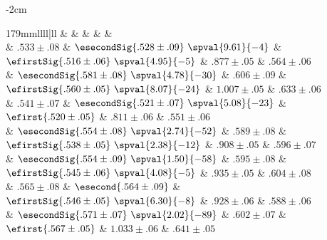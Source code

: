 \begin{table*}[hbt]
\begin{adjustwidth}{-2cm}{}
  \centering
  \small
  \caption{Same as \autoref{tab:edge_Wvaries_nami}, but reporting $d(\mathcal{D}_k,
  \mathcal{\wh{D}}_k)$, which should be as close as possible to $0$.
  \label{tab:edge_Wvaries_dst}}
  \begin{tabulary}{179mm}{llll|ll}
      \toprule
       &                                 \thead{\kmeans{}} &                                  \thead{\lloyd{}} &                              \thead{\combined{}} &   \thead{\fwa{}} &  \thead{\pqt{}} \\
      \midrule
      {} &                                    $.533 \pm .08$ &   $\esecondSig{.528 \pm .09}\,\,\spval{9.61}{-4}$ &   $\efirstSig{.516 \pm .06}\,\,\spval{4.95}{-5}$ &   $.877 \pm .05$ &  $.564 \pm .06$ \\
      {\smallk{}}  &  $\esecondSig{.581 \pm .08}\,\,\spval{4.78}{-30}$ &                                    $.606 \pm .09$ &  $\efirstSig{.560 \pm .05}\,\,\spval{8.07}{-24}$ &  $1.007 \pm .05$ &  $.633 \pm .06$ \\
      {\largek{}}  &                                    $.541 \pm .07$ &  $\esecondSig{.521 \pm .07}\,\,\spval{5.08}{-23}$ &                          $\efirst{.520 \pm .05}$ &   $.811 \pm .06$ &  $.551 \pm .06$ \\
      {\smallo{}}  &  $\esecondSig{.554 \pm .08}\,\,\spval{2.74}{-52}$ &                                    $.589 \pm .08$ &  $\efirstSig{.538 \pm .05}\,\,\spval{2.38}{-12}$ &   $.908 \pm .05$ &  $.596 \pm .07$ \\
      {\largeo{}}  &  $\esecondSig{.554 \pm .09}\,\,\spval{1.50}{-58}$ &                                    $.595 \pm .08$ &   $\efirstSig{.545 \pm .06}\,\,\spval{4.08}{-5}$ &   $.935 \pm .05$ &  $.604 \pm .08$ \\
      {\fdirs{}}   &                                    $.565 \pm .08$ &                          $\esecond{.564 \pm .09}$ &   $\efirstSig{.546 \pm .05}\,\,\spval{6.30}{-8}$ &   $.928 \pm .06$ &  $.588 \pm .06$ \\
      {\larged{}}  &  $\esecondSig{.571 \pm .07}\,\,\spval{2.02}{-89}$ &                                    $.602 \pm .07$ &                          $\efirst{.567 \pm .05}$ &  $1.033 \pm .06$ &  $.641 \pm .05$ \\
      \bottomrule
    \end{tabulary}
\end{adjustwidth}
\end{table*}


